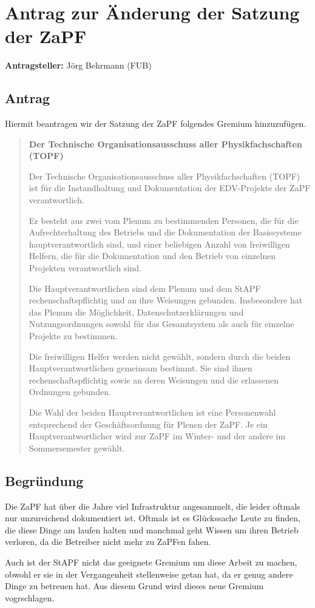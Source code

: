 \documentclass[draft,12pt,oneside]{scrartcl}
\begin{document}
\section*{Antrag zur Änderung der Satzung der ZaPF}

\textbf{Antragsteller:} Jörg Behrmann (FUB)

\subsection*{Antrag}

Hiermit beantragen wir der Satzung der ZaPF folgendes Gremium hinzuzufügen.

\begin{quote}
\textbf{Der Technische Organisationsausschuss aller Physikfachschaften (TOPF)}

Der Technische Organisationsausschuss aller Physikfachschaften (TOPF) ist für
die Instandhaltung und Dokumentation der EDV-Projekte der ZaPF verantwortlich.

Er besteht aus zwei vom Plenum zu bestimmenden Personen, die für die
Aufrechterhaltung des Betriebs und die Dokumentation der Basissysteme
hauptverantwortlich sind, und einer beliebigen Anzahl von freiwilligen Helfern,
die für die Dokumentation und den Betrieb von einzelnen Projekten verantwortlich
sind.

Die Hauptverantwortlichen sind dem Plenum und dem StAPF rechenschaftspflichtig
und an ihre Weisungen gebunden. Insbesondere hat das Plenum die Möglichkeit,
Datenschutzerklärungen und Nutzungsordnungen sowohl für das Gesamtsystem als
auch für einzelne Projekte zu bestimmen.

Die freiwilligen Helfer werden nicht gewählt, sondern durch die beiden
Hauptverantwortlichen gemeinsam bestimmt. Sie sind ihnen rechenschaftspflichtig
sowie an deren Weisungen und die erlassenen Ordnungen gebunden.

Die Wahl der beiden Hauptverantwortlichen ist eine Personenwahl entsprechend der
Geschäftsordnung für Plenen der ZaPF.  Je ein Hauptverantwortlicher wird zur
ZaPF im Winter- und der andere im Sommersemester gewählt.

\end{quote}

\subsection*{Begründung}

Die ZaPF hat über die Jahre viel Infrastruktur angesammelt, die leider oftmals
nur unzureichend dokumentiert ist. Oftmals ist es Glückssache Leute zu finden,
die diese Dinge am laufen halten und manchmal geht Wissen um ihren Betrieb
verloren, da die Betreiber nicht mehr zu ZaPFen fahen.

Auch ist der StAPF nicht das geeignete Gremium um diese Arbeit zu machen, obwohl
er sie in der Vergangenheit stellenweise getan hat, da er genug andere Dinge zu
betreuen hat. Aus diesem Grund wird dieses neue Gremium vogrschlagen.
\end{document}
